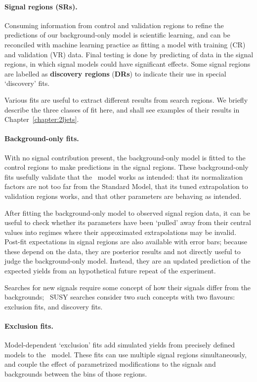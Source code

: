 \paragraph{Signal regions (SRs).}
Consuming information from control and validation regions to refine the
predictions of our background-only model is scientific learning, and can be
reconciled with machine learning practice as fitting a model with training
(CR) and validation (VR) data.
Final testing is done by predicting of data in the signal regions, in which
signal models could have significant effects.
Some signal regions are labelled as \textbf{discovery regions} (\textbf{DRs})
to indicate their use in special `discovery' fits.

Various fits are useful to extract different results from search regions.
We briefly describe the three classes of fit here, and shall see examples
of their results in Chapter~\ref{chapter:2ljets}.

\paragraph{Background-only fits.}
With no signal contribution present, the background-only model is fitted
to the control regions to make predictions in the signal regions.
These background-only fits usefully validate that the \heplikelihood\ model
works as intended: that its normalization factors are not too far from the
Standard Model, that its tuned extrapolation to validation regions works,
and that other parameters are behaving as intended.

After fitting the background-only model to observed signal region data,
it can be useful to check whether its parameters have been `pulled' away from
their central values into regimes where their approximated extrapolations may
be invalid.
Post-fit expectations in signal regions are also available with error bars;
because these depend on the data, they are posterior results and not directly
useful to judge the background-only model.
Instead, they are an updated prediction of the expected yields from an
hypothetical future repeat of the experiment.

Searches for new signals require some concept of how their signals differ
from the backgrounds;
\atlas\ SUSY searches consider two such concepts with two flavours:
exclusion fits, and discovery fits.

\paragraph{Exclusion fits.}
Model-dependent `exclusion' fits add simulated yields from precisely
defined models to the \heplikelihood\ model.
These fits can use multiple signal regions simultaneously, and couple the
effect of parametrized modifications to the signals and backgrounds between
the bins of those regions.

